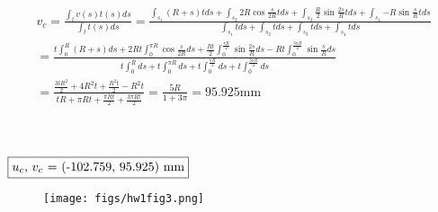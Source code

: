 \documentclass[12 pt]{article}
\begin{document}
\begin{align*}
    v_c=\frac{\int_{l}{v(s)t(s) ds}}{\int_{l}{t(s) ds}} =
    \frac{\int_{s_1}{(R+s)tds} + \int_{s_2}{2R\cos{\frac{s}{2R}}tds} + \int_{s_3}{\frac{R}{2}\sin{\frac{2s}{R}}tds} +
    \int_{s_4}{-R\sin{\frac{s}{R}}tds}}{\int_{s_1}{tds} + \int_{s_2}{tds} + \int_{s_3}{tds} + \int_{s_4}{tds}} \\
    =\frac{t\int_{0}^{R}{(R+s)ds} + 2Rt\int_{0}^{\pi R}{\cos{\frac{s}{2R}}ds} + \frac{Rt}{2}\int_{0}^{\frac{\pi R}{2}}
    {\sin{\frac{2s}{R}}ds} - Rt\int_{0}^{\frac{3\pi R}{2}}{\sin{\frac{s}{R}}ds}}{t\int_{0}^{R}{ds} + t\int_{0}^{\pi R}{ds}
    + t\int_{0}^{\frac{\pi R}{2}}{ds} + t\int_{0}^{\frac{3\pi R}{2}}{ds}} \\
    =\frac{\frac{3tR^2}{2} + 4R^2t + \frac{R^2t}{2} - R^2t}{tR + \pi Rt + \frac{\pi Rt}{2} + \frac{3\pi Rt}{2}}
    = \frac{5R}{1+3\pi} = 95.925\textrm{mm}
\end{align*} \\ \\
\begin{center} $\fbox{$u_c$, $v_c$ = (-102.759, 95.925) mm}$ \end{center}
\begin{figure}[H]
    \centering
    \texttt{[image: figs/hw1fig3.png]}
\end{figure}
\end{document}

